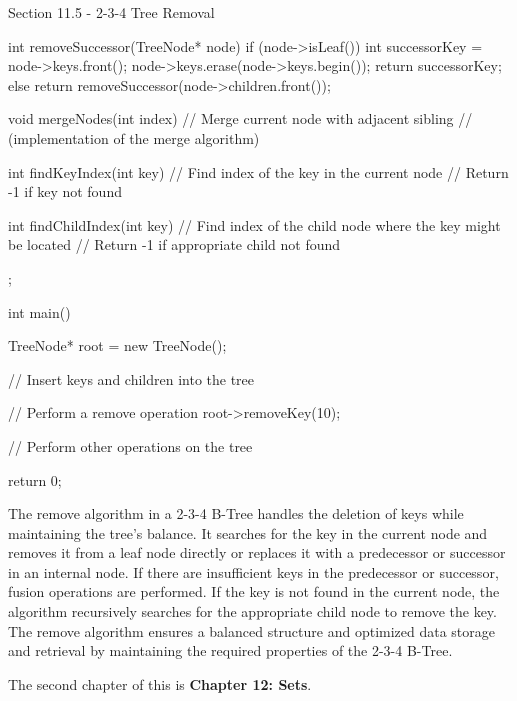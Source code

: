 \begin{notes}{Section 11.5 - 2-3-4 Tree Removal}
\begin{highlight}
\begin{code}[C++]
{            int removeSuccessor(TreeNode* node) {
                if (node->isLeaf()) {
                    int successorKey = node->keys.front();
                    node->keys.erase(node->keys.begin());
                    return successorKey;
                } else {
                    return removeSuccessor(node->children.front());
                }
            }
        
            void mergeNodes(int index) {
                // Merge current node with adjacent sibling
                // (implementation of the merge algorithm)
            }
        
            int findKeyIndex(int key) {
                // Find index of the key in the current node
                // Return -1 if key not found
            }
        
            int findChildIndex(int key) {
                // Find index of the child node where the key might be located
                // Return -1 if appropriate child not found
            }
        };
        
        int main() {
            TreeNode* root = new TreeNode();
        
            // Insert keys and children into the tree
        
            // Perform a remove operation
            root->removeKey(10);
        
            // Perform other operations on the tree
        
            return 0;
        }        
        \end{code}
        The remove algorithm in a 2-3-4 B-Tree handles the deletion of keys while maintaining the tree's balance. It searches for the key in the current node and removes it from a leaf node directly or replaces it with a predecessor or successor in an internal node. If there are insufficient keys in the predecessor or successor, fusion 
        operations are performed. If the key is not found in the current node, the algorithm recursively searches for the appropriate child node to remove the key. The remove algorithm ensures a balanced structure and optimized data storage and retrieval by maintaining the required properties of the 2-3-4 B-Tree.
    \end{highlight}
\end{notes}

The second chapter of this is \textbf{Chapter 12: Sets}.

